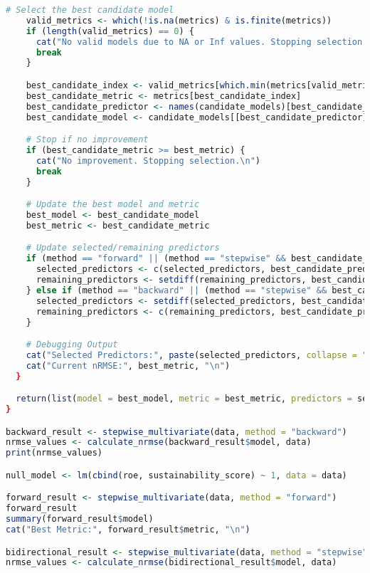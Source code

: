 \begin{lstlisting}[language=R, breaklines=true, basicstyle=\ttfamily\small, columns=fullflexible]
    # Select the best candidate model
    valid_metrics <- which(!is.na(metrics) & is.finite(metrics))
    if (length(valid_metrics) == 0) {
      cat("No valid models due to NA or Inf values. Stopping selection.\n")
      break
    }

    best_candidate_index <- valid_metrics[which.min(metrics[valid_metrics])]
    best_candidate_metric <- metrics[best_candidate_index]
    best_candidate_predictor <- names(candidate_models)[best_candidate_index]
    best_candidate_model <- candidate_models[[best_candidate_predictor]]

    # Stop if no improvement
    if (best_candidate_metric >= best_metric) {
      cat("No improvement. Stopping selection.\n")
      break
    }

    # Update the best model and metric
    best_model <- best_candidate_model
    best_metric <- best_candidate_metric

    # Update selected/remaining predictors
    if (method == "forward" || (method == "stepwise" && best_candidate_predictor %in% remaining_predictors)) {
      selected_predictors <- c(selected_predictors, best_candidate_predictor)
      remaining_predictors <- setdiff(remaining_predictors, best_candidate_predictor)
    } else if (method == "backward" || (method == "stepwise" && best_candidate_predictor %in% selected_predictors)) {
      selected_predictors <- setdiff(selected_predictors, best_candidate_predictor)
      remaining_predictors <- c(remaining_predictors, best_candidate_predictor)
    }

    # Debugging Output
    cat("Selected Predictors:", paste(selected_predictors, collapse = ", "), "\n")
    cat("Current nRMSE:", best_metric, "\n")
  }

  return(list(model = best_model, metric = best_metric, predictors = selected_predictors))
}

backward_result <- stepwise_multivariate(data, method = "backward")
nrmse_values <- calculate_nrmse(backward_result$model, data)
print(nrmse_values)

null_model <- lm(cbind(roe, sustainability_score) ~ 1, data = data)

forward_result <- stepwise_multivariate(data, method = "forward")
forward_result
summary(forward_result$model)
cat("Best Metric:", forward_result$metric, "\n")

bidirectional_result <- stepwise_multivariate(data, method = "stepwise")
nrmse_values <- calculate_nrmse(bidirectional_result$model, data)


\end{lstlisting}
